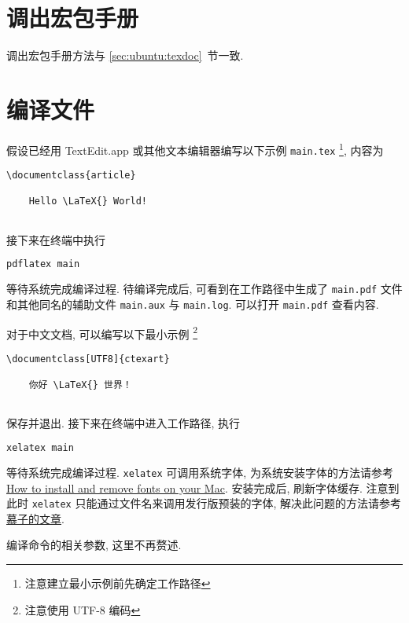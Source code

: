 \section{调出宏包手册}

调出宏包手册方法与 \ref{sec:ubuntu:texdoc}~节一致.

\section{编译文件}

假设已经用 TextEdit.app 或其他文本编辑器编写以下示例 \texttt{main.tex}%
\footnote{注意建立最小示例前先确定工作路径},
内容为
\begin{lstlisting}[language = {[LaTeX]TeX}]
  \documentclass{article}
  
    Hello \LaTeX{} World!
  
\end{lstlisting}
接下来在\textsf{终端}中执行
\begin{lstlisting}[language=bash]
  pdflatex main
\end{lstlisting}
等待系统完成编译过程. 
待编译完成后, 可看到在工作路径中生成了 \texttt{main.pdf}
文件和其他同名的辅助文件 \texttt{main.aux} 与 \texttt{main.log}.
可以打开 \texttt{main.pdf} 查看内容.

对于中文文档, 可以编写以下最小示例%
\footnote{注意使用 UTF-8 编码}%
\begin{lstlisting}[language={[LaTeX]TeX}]
  \documentclass[UTF8]{ctexart}
  
    你好 \LaTeX{} 世界！
  
\end{lstlisting}
保存并退出.
接下来在\textsf{终端}中进入工作路径,
执行
\begin{lstlisting}[language=bash]
  xelatex main
\end{lstlisting}
等待系统完成编译过程.
\texttt{xelatex} 可调用系统字体,
为系统安装字体的方法请参考
\href{https://support.apple.com/en-us/HT201749}{How to install and remove fonts on your Mac}.
安装完成后, 刷新字体缓存.
注意到此时 \texttt{xelatex} 只能通过文件名来调用发行版预装的字体,
解决此问题的方法请参考%
\href{https://zhuanlan.zhihu.com/p/59774395}{慕子的文章}.

编译命令的相关参数, 这里不再赘述.
